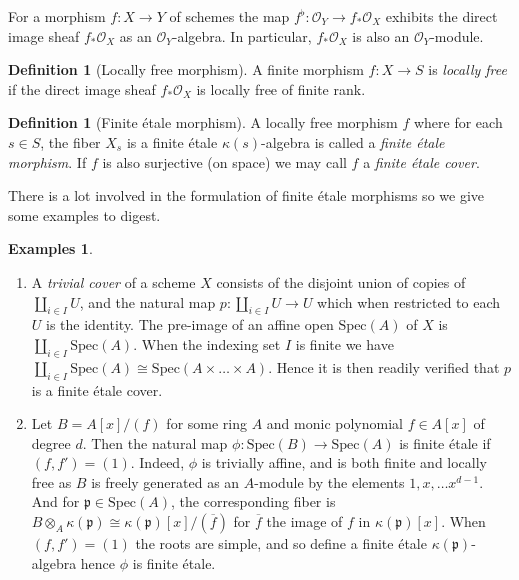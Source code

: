 \documentclass{article}
\theoremstyle{definition}
\newtheorem{definition}[theorem]{Definition}
\newtheorem{examples}[theorem]{Examples}
\theoremstyle{remark}
\theoremstyle{plain}
\newcommand{\mc}[1]{\mathcal{#1}}
\newcommand{\mk}[1]{\mathfrak{#1}}
\begin{document}
For a morphism $f: X \to Y$ of schemes the map $f^{\flat}: \mc{O}_Y \to f_*\mc{O}_X$ exhibits the direct image sheaf $f_* \mc{O}_X$ as an $\mc{O}_Y$-algebra.
In particular, $f_* \mc{O}_X$ is also an $\mc{O}_Y$-module.

\begin{definition}[Locally free morphism]	
	A finite morphism $f: X \to S$ is \textit{locally free} if the direct image sheaf $f_* \mc{O}_X$ is locally free of finite rank.   
\end{definition}

\begin{definition}[Finite \'etale morphism]
	A locally free morphism $f$ where for each $s \in S$, the fiber $X_s$ is a finite \'etale $\kappa(s)$-algebra is called a \textit{finite \'etale morphism}.
	If $f$ is also surjective (on space) we may call $f$ a \textit{finite \'etale cover}.
\end{definition}

There is a lot involved in the formulation of finite \'etale morphisms so we give some examples to digest.

\begin{examples}\text{} 
	\begin{enumerate}
\item 	A \textit{trivial cover} of a scheme $X$ consists of the disjoint union of copies of $\coprod_{i \in I} U$, and the natural map $p: \coprod_{i \in I} U \to U$ which when restricted to each $U$ is the identity.
	The pre-image of an affine open $\text{Spec}(A)$ of $X$ is $\coprod_{i \in I} \text{Spec}(A)$.
	When the indexing set $I$ is finite we have $\coprod_{i \in I} \text{Spec}(A) \cong \text{Spec}(A \times \dots \times A)$.
	Hence it is then readily verified that $p$ is a finite \'etale cover.
\item  Let $B = A[x]/(f)$  for some ring $A$ and monic polynomial $f \in A[x]$ of degree $d$.
	Then the natural map $\phi: \text{Spec}(B) \to \text{Spec}(A)$ is finite \'etale if $(f, f') = (1)$.
	Indeed, $\phi$ is trivially affine, and is both finite and locally free as $B$ is freely generated as an $A$-module by the elements $1,x, \dots x^{d-1}$.
	And for $\mk{p} \in \text{Spec}(A)$, the corresponding fiber is $B \otimes_A \kappa(\mk{p}) \cong \kappa(\mk{p})[x]/(\overline{f})$ for $\overline{f}$ the image of $f$ in $\kappa(\mk{p})[x]$.
	When $(f, f') = (1)$ the roots are simple, and so define a finite \'etale $\kappa(\mk{p})$-algebra hence $\phi$ is finite \'etale.
    \end{enumerate}	 
\end{examples}
\end{document}

